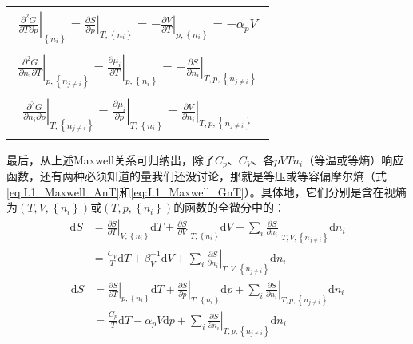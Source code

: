 \documentclass[main.tex]{subfiles}
\begin{document}
\begin{longtable}{m{}}
    \begin{align}
        \left.\frac{\partial^2 G}{\partial T\partial p}\right|_{\left\{n_i\right\}}              =\left.\frac{\partial S}{\partial p}\right|_{T,\left\{n_i\right\}}=-\left.\frac{\partial V}{\partial T}\right|_{p,\left\{n_i\right\}}=-\alpha_p V\label{eq:I.1_Maxwell_GTp}\end{align}                  \\[-8ex]
    \begin{align}\left.\frac{\partial ^2G}{\partial n_i\partial T}\right|_{p,\left\{n_{j\neq i}\right\}}  =\left.\frac{\partial \mu_i}{\partial T}\right|_{p,\left\{n_i\right\}}=-\left.\frac{\partial S}{\partial n_i}\right|_{T,p,\left\{n_{j\neq i}\right\}}\label{eq:I.1_Maxwell_GnT}\end{align} \\[-8ex]
    \begin{align}\left.\frac{\partial ^2G}{\partial n_i\partial p}\right|_{T,\left\{n_{j\neq i}\right\}}  =\left.\frac{\partial \mu_i}{\partial p}\right|_{T,\left\{n_i\right\}}=\left.\frac{\partial V}{\partial n_i}\right|_{T,p,\left\{n_{j\neq i}\right\}}\label{eq:I.1_Maxwell_GnV}\end{align}  \\
    \hline
\end{longtable}
最后，从上述Maxwell关系可归纳出，除了$C_p$、$C_V$、各$pVTn_i$（等温或等熵）响应函数，还有两种必须知道的量我们还没讨论，那就是等压或等容偏摩尔熵（式\eqref{eq:I.1_Maxwell_AnT}和\eqref{eq:I.1_Maxwell_GnT}）。具体地，它们分别是含在视熵为$\left(T,V,\left\{n_i\right\}\right)$或$\left(T,p,\left\{n_i\right\}\right)$的函数的全微分中的：
\begin{equation}
    \begin{aligned}
        \mathrm{d}S & =\left.\frac{\partial S}{\partial T}\right|_{V,\left\{n_i\right\}}\mathrm{d}T+\left.\frac{\partial S}{\partial V}\right|_{T,\left\{n_i\right\}}\mathrm{d}V+\sum_i\left.\frac{\partial S}{\partial n_i}\right|_{T,V,\left\{n_{j\neq i}\right\}}\mathrm{d}n_i \\
                    & =\frac{C_V}{T}\mathrm{d}T+\beta_V^{-1}\mathrm{d}V+\sum_i\left.\frac{\partial S}{\partial n_i}\right|_{T,V,\left\{n_{j\neq i}\right\}}\mathrm{d}n_i \label{eq:I.1_dS_T_V}
    \end{aligned}
\end{equation}
\begin{equation}
    \begin{aligned}
        \mathrm{d}S & =\left.\frac{\partial S}{\partial T}\right|_{p,\left\{n_i\right\}}\mathrm{d}T+\left.\frac{\partial S}{\partial p}\right|_{T,\left\{n_i\right\}}\mathrm{d}p+\sum_i\left.\frac{\partial S}{\partial n_i}\right|_{T,p,\left\{n_{j\neq i}\right\}}\mathrm{d}n_i \\
                    & =\frac{C_p}{T}\mathrm{d}T-\alpha_pV\mathrm{d}p+\sum_i\left.\frac{\partial S}{\partial n_i}\right|_{T,p,\left\{n_{j\neq i}\right\}}\mathrm{d}n_i\label{eq:I.1_dS_T_p}
    \end{aligned}
\end{equation}
\end{document}
